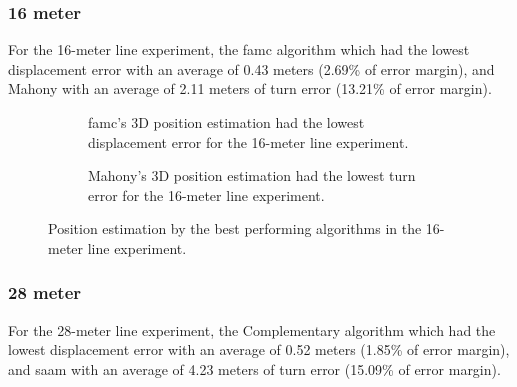 \newpage

\subsubsection{16 meter}

For the 16-meter line experiment, the \acrshort{famc} algorithm which had the lowest displacement error with an average of 0.43 meters (2.69\% of error margin), and Mahony with an average of 2.11 meters of turn error (13.21\% of error margin).

\vspace{-0.5cm}

\vspace{-1.5cm}

\begin{figure}[H]
    \centering
    \begin{subfigure}{0.49\textwidth}
        \centering
        \resizebox{1\linewidth}{!}{}
        \caption{ \acrshort{famc}'s 3D position estimation had the lowest displacement error for the 16-meter line experiment. }
        \label{fig:line16_2D}
    \end{subfigure}
    \begin{subfigure}{0.49\textwidth}
        \centering
        \resizebox{1\linewidth}{!}{}
        \caption{Mahony's 3D position estimation had the lowest turn error for the 16-meter line experiment.}
        \label{fig:line16_3D}
    \end{subfigure}
    \caption{Position estimation by the best performing algorithms in the 16-meter line experiment.}
    \label{fig:line16}
\end{figure}

\newpage

\subsubsection{28 meter}

For the 28-meter line experiment, the Complementary algorithm which had the lowest displacement error with an average of 0.52 meters (1.85\% of error margin), and \acrshort{saam} with an average of 4.23 meters of turn error (15.09\% of error margin).

\vspace{-0.5cm}

\vspace{-1.5cm}

